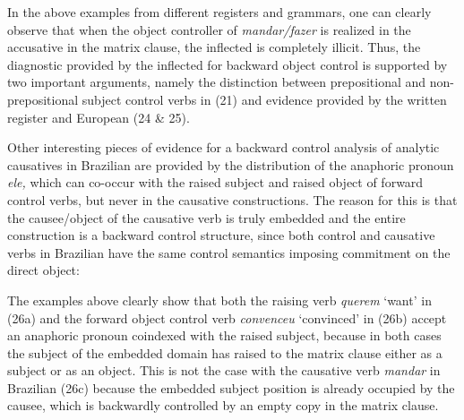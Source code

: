 \documentclass[output=paper]{langsci/langscibook}
\begin{document}
In the above examples from different registers and grammars, one can clearly observe that when the object controller of \textit{mandar\slash fazer}\textbf{ }is realized in the accusative in the matrix clause, the inflected  is completely illicit. Thus, the diagnostic provided by the inflected  for backward object control is supported by two important arguments, namely the distinction between prepositional and non{}-prepositional subject control verbs in (21) and evidence provided by the written register and European  (24 \& 25).

Other interesting pieces of evidence for a backward control analysis of analytic causatives in Brazilian  are provided by the distribution of the anaphoric pronoun \textit{ele,} which can co-occur with the raised subject and raised object of forward control verbs, but never in the causative constructions. The reason for this is that the causee\slash object of the causative verb is truly embedded and the entire construction is a backward control structure, since both control and causative verbs in Brazilian  have the same control semantics imposing commitment on the direct object:

\ea%
    \label{ex:moreno:26}
    \z
\z
    
The examples above clearly show that both the raising verb \textit{querem} ‘want’ in (26a) and the forward object control verb \textit{convenceu} ‘convinced’ in (26b) accept an anaphoric pronoun coindexed with the raised subject, because in both cases the subject of the embedded domain has raised to the matrix clause either as a subject or as an object. This is not the case with the causative verb \textit{mandar} in Brazilian  (26c) because the embedded subject position is already occupied by the causee, which is backwardly controlled by an empty copy in the matrix clause. 
\end{document}
